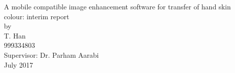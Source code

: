 \documentclass[12pt,a4paper]{report}
\begin{document}
\begin{titlepage}
	\centering
	\vspace{1.5cm}
	\huge A mobile compatible image enhancement software for transfer of hand skin colour: interim report\\
	\vspace{3cm}
	\large by\\
	\vspace{1cm}
	\large T. Han\\
	\large 999334803\\
	\vspace{1cm}
	\large Supervisor: Dr. Parham Aarabi\\
	\large July 2017\\
	\vfill
	
\end{titlepage}
\end{document}
